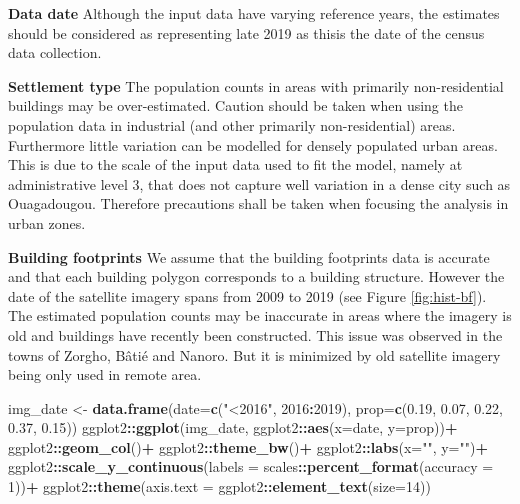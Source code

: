 \documentclass[]{book}
\newenvironment{Shaded}{\begin{snugshade}}{\end{snugshade}}
\newcommand{\KeywordTok}[1]{\textcolor[rgb]{0.13,0.29,0.53}{\textbf{#1}}}
\newcommand{\DataTypeTok}[1]{\textcolor[rgb]{0.13,0.29,0.53}{#1}}
\newcommand{\DecValTok}[1]{\textcolor[rgb]{0.00,0.00,0.81}{#1}}
\newcommand{\FloatTok}[1]{\textcolor[rgb]{0.00,0.00,0.81}{#1}}
\newcommand{\StringTok}[1]{\textcolor[rgb]{0.31,0.60,0.02}{#1}}
\newcommand{\OperatorTok}[1]{\textcolor[rgb]{0.81,0.36,0.00}{\textbf{#1}}}
\newcommand{\NormalTok}[1]{#1}
\begin{document}
\textbf{Data date} Although the input data have varying reference years,
the estimates should be considered as representing late 2019 as thisis
the date of the census data collection.

\textbf{Settlement type} The population counts in areas with primarily
non-residential buildings may be over-estimated. Caution should be taken
when using the population data in industrial (and other primarily
non-residential) areas. Furthermore little variation can be modelled for
densely populated urban areas. This is due to the scale of the input
data used to fit the model, namely at administrative level 3, that does
not capture well variation in a dense city such as Ouagadougou.
Therefore precautions shall be taken when focusing the analysis in urban
zones.

\textbf{Building footprints} We assume that the building footprints data
is accurate and that each building polygon corresponds to a building
structure. However the date of the satellite imagery spans from 2009 to
2019 (see Figure \ref{fig:hist-bf}). The estimated population counts may
be inaccurate in areas where the imagery is old and buildings have
recently been constructed. This issue was observed in the towns of
Zorgho, Bâtié and Nanoro. But it is minimized by old satellite imagery
being only used in remote area.

\begin{Shaded}
\begin{Highlighting}[]
\NormalTok{img_date <-}\StringTok{ }\KeywordTok{data.frame}\NormalTok{(}\DataTypeTok{date=}\KeywordTok{c}\NormalTok{(}\StringTok{"<2016"}\NormalTok{, }\DecValTok{2016}\OperatorTok{:}\DecValTok{2019}\NormalTok{), }\DataTypeTok{prop=}\KeywordTok{c}\NormalTok{(}\FloatTok{0.19}\NormalTok{, }\FloatTok{0.07}\NormalTok{, }\FloatTok{0.22}\NormalTok{, }\FloatTok{0.37}\NormalTok{, }\FloatTok{0.15}\NormalTok{))}
\NormalTok{ggplot2}\OperatorTok{::}\KeywordTok{ggplot}\NormalTok{(img_date, ggplot2}\OperatorTok{::}\KeywordTok{aes}\NormalTok{(}\DataTypeTok{x=}\NormalTok{date, }\DataTypeTok{y=}\NormalTok{prop))}\OperatorTok{+}
\StringTok{  }\NormalTok{ggplot2}\OperatorTok{::}\KeywordTok{geom_col}\NormalTok{()}\OperatorTok{+}
\StringTok{  }\NormalTok{ggplot2}\OperatorTok{::}\KeywordTok{theme_bw}\NormalTok{()}\OperatorTok{+}
\StringTok{  }\NormalTok{ggplot2}\OperatorTok{::}\KeywordTok{labs}\NormalTok{(}\DataTypeTok{x=}\StringTok{""}\NormalTok{, }\DataTypeTok{y=}\StringTok{""}\NormalTok{)}\OperatorTok{+}
\StringTok{  }\NormalTok{ggplot2}\OperatorTok{::}\KeywordTok{scale_y_continuous}\NormalTok{(}\DataTypeTok{labels =}\NormalTok{ scales}\OperatorTok{::}\KeywordTok{percent_format}\NormalTok{(}\DataTypeTok{accuracy =} \DecValTok{1}\NormalTok{))}\OperatorTok{+}
\StringTok{  }\NormalTok{ggplot2}\OperatorTok{::}\KeywordTok{theme}\NormalTok{(}\DataTypeTok{axis.text =}\NormalTok{ ggplot2}\OperatorTok{::}\KeywordTok{element_text}\NormalTok{(}\DataTypeTok{size=}\DecValTok{14}\NormalTok{))}
\end{Highlighting}
\end{Shaded}
\end{document}
